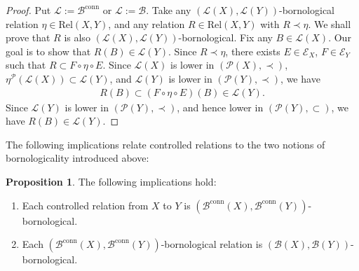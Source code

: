 \documentclass[12pt, a4paper]{amsart}
\theoremstyle{definition}
\newtheorem{proposition}[theorem]{Proposition}
\newcommand{\Rel}{\mathrm{Rel}}
\begin{document}
\begin{proof}
Put $\mathcal{L} := \mathcal{B}^{\mathrm{conn}}$ or $\mathcal{L} := \mathcal{B}$.
Take any $(\mathcal{L}(X),\mathcal{L}(Y))$-bornological relation $\eta \in \Rel(X,Y)$, and any relation $R \in \Rel(X,Y)$ with $R \prec \eta$.
We shall prove that $R$ is also $(\mathcal{L}(X),\mathcal{L}(Y))$-bornological.
Fix any $B \in \mathcal{L}(X)$. Our goal is to show that $R(B) \in \mathcal{L}(Y)$.
Since $R \prec \eta$, 
there exists $E \in \mathcal{E}_X$, $F \in \mathcal{E}_Y$ such that $R \subset F \circ \eta \circ E$.
Since 
$\mathcal{L}(X)$ is lower in $(\mathcal{P}(X),\prec)$, 
$\eta^\mathcal{P}(\mathcal{L}(X)) \subset \mathcal{L}(Y)$, 
and 
$\mathcal{L}(Y)$ is lower in $(\mathcal{P}(Y),\prec)$, 
we have 
\begin{align*}
R(B) \subset (F \circ \eta \circ E)(B) \in \mathcal{L}(Y).
\end{align*}
Since  
$\mathcal{L}(Y)$ is lower in $(\mathcal{P}(Y),\prec)$, and hence lower in $(\mathcal{P}(Y),\subset)$, 
we have $R(B) \in \mathcal{L}(Y)$.
\end{proof}


The following implications relate controlled relations to the two notions of bornologicality introduced above:

\begin{proposition}\label{proposition:cont_prev_bornology}
The following implications hold:
\begin{enumerate}
    \item Each controlled relation from $X$ to $Y$ is $(\mathcal{B}^{\mathrm{conn}}(X),\mathcal{B}^{\mathrm{conn}}(Y))$-bornological.
    \item Each $(\mathcal{B}^{\mathrm{conn}}(X),\mathcal{B}^{\mathrm{conn}}(Y))$-bornological relation is $(\mathcal{B}(X),\mathcal{B}(Y))$-bornological.
\end{enumerate}
\end{proposition}
\end{document}
